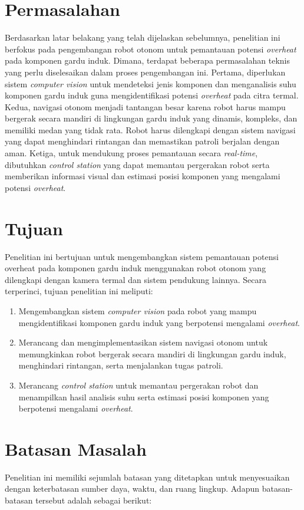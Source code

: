 \section{Permasalahan}
Berdasarkan latar belakang yang telah dijelaskan sebelumnya, penelitian ini berfokus pada pengembangan robot otonom untuk pemantauan potensi \emph{overheat} pada komponen gardu induk. Dimana, terdapat beberapa permasalahan teknis yang perlu diselesaikan dalam proses pengembangan ini. Pertama, diperlukan sistem \emph{computer vision} untuk mendeteksi jenis komponen dan menganalisis suhu komponen gardu induk guna mengidentifikasi potensi \emph{overheat} pada citra termal. Kedua, navigasi otonom menjadi tantangan besar karena robot harus mampu bergerak secara mandiri di lingkungan gardu induk yang dinamis, kompleks, dan memiliki medan yang tidak rata. Robot harus dilengkapi dengan sistem navigasi yang dapat menghindari rintangan dan memastikan patroli berjalan dengan aman. Ketiga, untuk mendukung proses pemantauan secara \emph{real-time}, dibutuhkan \emph{control station} yang dapat memantau pergerakan robot serta memberikan informasi visual dan estimasi posisi komponen yang mengalami potensi \emph{overheat}.


\section{Tujuan}
\label{sec:Tujuan}
Penelitian ini bertujuan untuk mengembangkan sistem pemantauan potensi overheat pada komponen gardu induk menggunakan robot otonom yang dilengkapi dengan kamera termal dan sistem pendukung lainnya. Secara terperinci, tujuan penelitian ini meliputi:
\begin{enumerate}
      \item Mengembangkan sistem \emph{computer vision} pada robot yang mampu  mengidentifikasi komponen gardu induk yang berpotensi mengalami \emph{overheat}.
      \item Merancang dan mengimplementasikan sistem navigasi otonom untuk memungkinkan robot bergerak secara mandiri di lingkungan gardu induk, menghindari rintangan, serta menjalankan tugas patroli.
      \item Merancang \emph{control station} untuk memantau pergerakan robot dan menampilkan hasil analisis suhu serta estimasi posisi komponen yang berpotensi mengalami \emph{overheat}.
\end{enumerate}

\newpage


\section{Batasan Masalah}
Penelitian ini memiliki sejumlah batasan yang ditetapkan untuk menyesuaikan dengan keterbatasan sumber daya, waktu, dan ruang lingkup. Adapun batasan-batasan tersebut adalah sebagai berikut:

